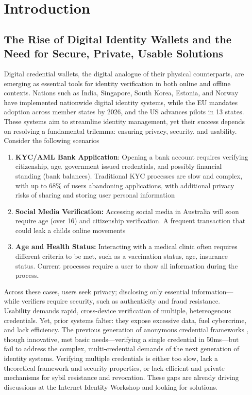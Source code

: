 \chapter{Introduction}

\section{The Rise of Digital Identity Wallets and the Need for Secure, Private, Usable Solutions}
Digital credential wallets, the digital analogue of their physical counterparts, are emerging as essential tools for identity verification in both online and offline contexts. Nations such as India, Singapore, South Korea, Estonia, and Norway have implemented nationwide digital identity systems, while the EU mandates adoption across member states by 2026, and the US advances pilots in 13 states.  These systems aim to streamline identity management, yet their success depends on resolving a fundamental trilemma: ensuring privacy, security, and usability. Consider the following scenarios

\begin{enumerate}
    \item \textbf{KYC/AML Bank Application}: Opening a bank account requires verifying citizenship, age, government issued credentials, and possibly financial standing (bank balances). Traditional KYC processes are slow and complex, with up to 68\% of users abandoning applications, with additional privacy risks of sharing and storing user personal information

    \item \textbf{Social Media Verification:} Accessing social media in Australia will soon require age (over 16) and citizenship verification. A frequent transaction that could leak a childs online movements 

    \item \textbf{Age and Health Status: } Interacting with a medical clinic often requires different criteria to be met, such as a vaccination status, age, insurance status. Current processes require a user to show all information during the process. 
\end{enumerate}

Across these cases, users seek privacy; disclosing only essential information—while verifiers require security, such as authenticity and fraud resistance. Usability demands rapid, cross-device verification of multiple, hetereogenous credentials. Yet, prior systems falter: they expose excessive data, fuel cybercrime, and lack efficiency. The previous generation of anonymous credential frameworks \cite{hutchison_signature_2004, hutchison_constant-size_2006, sako_short_2016}, though innovative, met basic needs—verifying a single credential in 50ms—but fail to address the complex, multi-credential demands of the next generation of identity systems. Verifying multiple credentials is either too slow, lack a theoretical framework and security properties, or lack efficient and private mechanisms for sybil resistance and revocation. These gaps are already driving discussions at the Internet Identity Workshop \cite{internet_identity_workshop_internet_2025} and looking for solutions.

